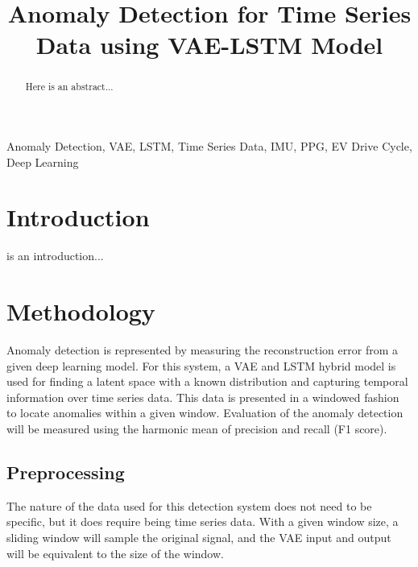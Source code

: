 \documentclass[conference]{IEEEtran}
\begin{document}
\title{Anomaly Detection for Time Series Data using VAE-LSTM Model}

\author{
    \and
    \and
}

\maketitle

\begin{abstract}
Here is an abstract...
\end{abstract}

\begin{IEEEkeywords}
Anomaly Detection, VAE, LSTM, Time Series Data, IMU, PPG, EV Drive Cycle, Deep Learning
\end{IEEEkeywords}

\section{Introduction}
 is an introduction...

\section{Methodology}
Anomaly detection is represented by measuring the reconstruction error from a given deep learning model. For this system, a VAE and LSTM hybrid model is used for finding a latent space with a known distribution and capturing temporal information over time series data. This data is presented in a windowed fashion to locate anomalies within a given window. Evaluation of the anomaly detection will be measured using the harmonic mean of precision and recall (F1 score).

\subsection{Preprocessing}
The nature of the data used for this detection system does not need to be specific, but it does require being time series data. With a given window size, a sliding window will sample the original signal, and the VAE input and output will be equivalent to the size of the window. 
\end{document}
